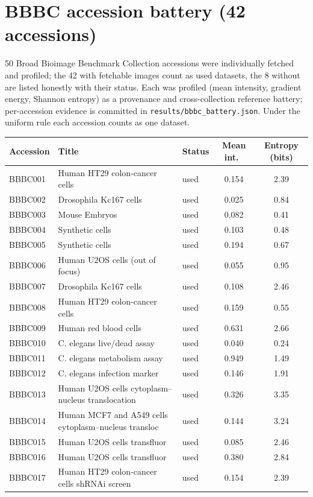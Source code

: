 
\section{BBBC accession battery (42 accessions)}
50 Broad Bioimage Benchmark Collection accessions were individually
fetched and profiled; the 42 with fetchable images count as used datasets,
the 8 without are listed honestly with their status. Each was profiled (mean intensity, gradient energy, Shannon entropy) as
a provenance and cross-collection reference battery; per-accession
evidence is committed in \texttt{results/bbbc\_battery.json}. Under the
uniform rule each accession counts as one dataset.
\begin{longtable}{l p{6.2cm} l c c}
\hline Accession & Title & Status & Mean int.\ & Entropy (bits) \\
\hline \endhead
BBBC001 & Human HT29 colon-cancer cells & used & 0.154 & 2.39 \\
BBBC002 & Drosophila Kc167 cells & used & 0.025 & 0.84 \\
BBBC003 & Mouse Embryos & used & 0.082 & 0.41 \\
BBBC004 & Synthetic cells & used & 0.103 & 0.48 \\
BBBC005 & Synthetic cells & used & 0.194 & 0.67 \\
BBBC006 & Human U2OS cells (out of focus) & used & 0.055 & 0.95 \\
BBBC007 & Drosophila Kc167 cells & used & 0.108 & 2.46 \\
BBBC008 & Human HT29 colon-cancer cells & used & 0.159 & 0.55 \\
BBBC009 & Human red blood cells & used & 0.631 & 2.66 \\
BBBC010 & C. elegans live/dead assay & used & 0.040 & 0.24 \\
BBBC011 & C. elegans metabolism assay & used & 0.949 & 1.49 \\
BBBC012 & C. elegans infection marker & used & 0.146 & 1.91 \\
BBBC013 & Human U2OS cells cytoplasm–nucleus translocation & used & 0.326 & 3.35 \\
BBBC014 & Human MCF7 and A549 cells cytoplasm–nucleus transloc & used & 0.144 & 3.24 \\
BBBC015 & Human U2OS cells transfluor & used & 0.085 & 2.46 \\
BBBC016 & Human U2OS cells transfluor & used & 0.380 & 2.84 \\
BBBC017 & Human HT29 colon-cancer cells shRNAi screen & used & 0.154 & 2.39 \\

\end{longtable}
